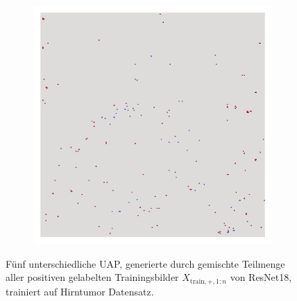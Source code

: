 \begin{figure}[H]
\begin{subfigure}{0.19\linewidth}
        \end{subfigure}\hfill%
        \begin{subfigure}{0.19\linewidth}
            \centering
            \includegraphics[height=1\linewidth]{01-images/05-resultate/uap_resnet18/uap4-resnet18-mri_data-n200-robustificationslevel0.png}
        \end{subfigure}
    \caption{Fünf unterschiedliche UAP, generierte durch gemischte Teilmenge aller positiven gelabelten Trainingsbilder $X_{\text{train},+,1:n}$ von ResNet18, trainiert auf Hirntumor Datensatz.}
    \label{fig:uap-resnet18-mri-robustification-0}
\end{figure}

